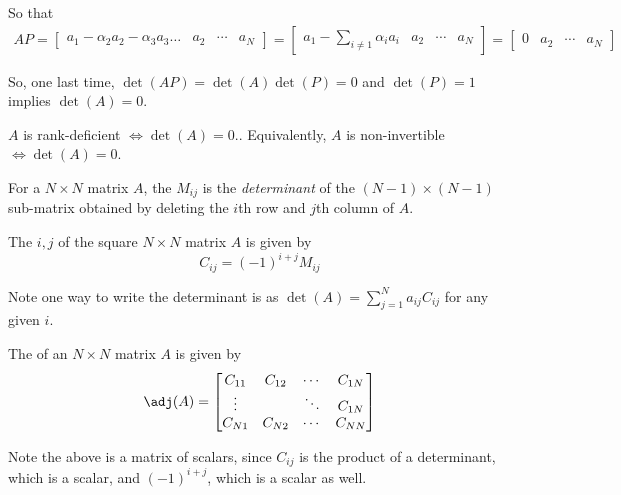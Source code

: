 \documentclass{article}
\begin{document}
\begin{enumerate}
    So that
    \begin{align*}
      A P
      =
      \begin{bmatrix}
        a_1 - \alpha_2 a_2 - \alpha_3 a_3 \ldots & a_2 & \cdots & a_N
      \end{bmatrix}
      =
      \begin{bmatrix}
        a_1 - \sum^{}_{i \ne  1} \alpha_i a_i & a_2 & \cdots & a_N
      \end{bmatrix}
      =
      \begin{bmatrix}
        0 & a_2 & \cdots & a_N
      \end{bmatrix}
    \end{align*}

    So, one last time, $\det(A P) = \det(A) \det(P) = 0$ and $\det(P) = 1$ implies $\det(A) = 0$.
\end{enumerate}

\begin{theorem}
  $A$ is rank-deficient $\iff \det(A) = 0$.. Equivalently, $A$ is non-invertible $\iff \det(A) = 0$.
\end{theorem}

\begin{definition}
  For a $N \times N$ matrix $A$, the $M_{ij}$  is the \textit{determinant} of the $(N - 1) \times (N - 1)$ sub-matrix obtained by deleting the $i$th row and $j$th column of $A$.
\end{definition}

\begin{definition}
  The $i, j$  of the square $N \times N$ matrix $A$ is given by
  \[
    C_{ij} = (-1)^{i + j} M_{ij}
  \]

  Note one way to write the determinant is as $\det(A) = \sum^{N}_{j = 1} a_{ij} C_{ij}$ for any given $i$.
\end{definition}

\begin{definition}
  The  of an $N \times N$ matrix $A$ is given by
  \[
    \adj(A) = \left[\begin{matrix}
        C_{11} & C_{12} & \cdots & C_{1N} \\
        \vdots &        & \ddots & C_{1N} \\
        C_{N1} & C_{N2} & \cdots & C_{NN}
    \end{matrix}\right]
  \]

  Note the above is a matrix of scalars, since $C_{ij}$ is the product of a determinant, which is a scalar, and $(-1)^{i + j}$, which is a scalar as well.
\end{definition}
\end{document}
